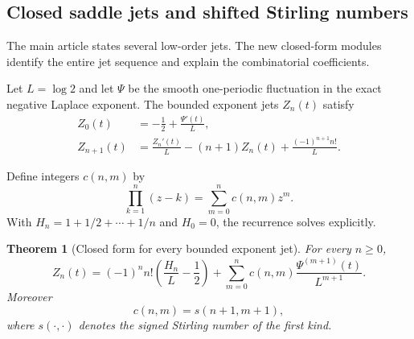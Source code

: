 \documentclass[11pt,oneside]{article}
\newtheorem{theorem}{Theorem}[section]
\theoremstyle{definition}
\theoremstyle{remark}
\begin{document}
\subsection{Closed saddle jets and shifted Stirling numbers}
\label{integration:sec:saddle-jets}

The main article states several low-order jets.  The new closed-form modules identify the
entire jet sequence and explain the combinatorial coefficients.

Let $L=\log2$ and let $\Psi$ be the smooth one-periodic fluctuation in the exact negative
Laplace exponent.  The bounded exponent jets $Z_n(t)$ satisfy
\begin{align}
 Z_0(t)&=-\frac12+\frac{\Psi'(t)}{L},                         \label{integration:eq:Z0-recurrence}\\
 Z_{n+1}(t)&=\frac{Z_n'(t)}{L}-(n+1)Z_n(t)
              +\frac{(-1)^{n+1}n!}{L}.                      \label{integration:eq:Z-recurrence}
\end{align}

Define integers $c(n,m)$ by
\begin{equation}
 \prod_{k=1}^{n}(z-k)=\sum_{m=0}^{n}c(n,m)z^m.
 \label{integration:eq:falling-shift-coeff}
\end{equation}
With $H_n=1+1/2+\cdots+1/n$ and $H_0=0$, the recurrence solves explicitly.

\begin{theorem}[Closed form for every bounded exponent jet]
\label{integration:thm:closed-saddle-jet}
For every $n\ge0$,
\begin{equation}
 Z_n(t)=(-1)^nn!\left(\frac{H_n}{L}-\frac12\right)
 +\sum_{m=0}^{n}c(n,m)
   \frac{\Psi^{(m+1)}(t)}{L^{m+1}}.
 \label{integration:eq:closed-saddle-jet}
\end{equation}
Moreover
\begin{equation}
 c(n,m)=s(n+1,m+1),
 \label{integration:eq:shifted-stirling}
\end{equation}
where $s(\cdot,\cdot)$ denotes the signed Stirling number of the first kind.
\end{theorem}
\end{document}
